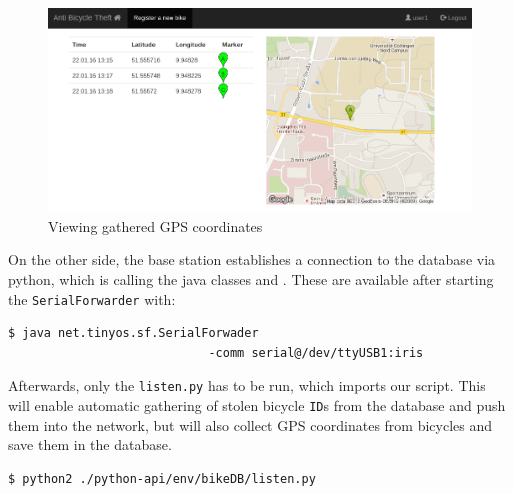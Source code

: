 \documentclass[a4paper]{article}
\begin{document}
\begin{figure}
\begin{center}
\includegraphics[scale=0.3]{pics/view.png}
\end{center}
\caption{Viewing gathered GPS coordinates}
\label{fig:GPSdata}
\end{figure}

On the other side, the base station establishes a connection to the database via python, which is calling the java classes \texttt{} and \texttt{}. These are available after starting the \texttt{SerialForwarder} with:
\begin{lstlisting}[frame=single,language=bash]
$ java net.tinyos.sf.SerialForwader
                            -comm serial@/dev/ttyUSB1:iris
\end{lstlisting}
Afterwards, only the \texttt{listen.py} has to be run, which imports our \texttt{} script. This will enable automatic gathering of stolen bicycle \texttt{ID}s from the database and push them into the network, but will also collect GPS coordinates from bicycles and save them in the database.
\begin{lstlisting}[frame=single]
$ python2 ./python-api/env/bikeDB/listen.py
\end{lstlisting}
\end{document}
